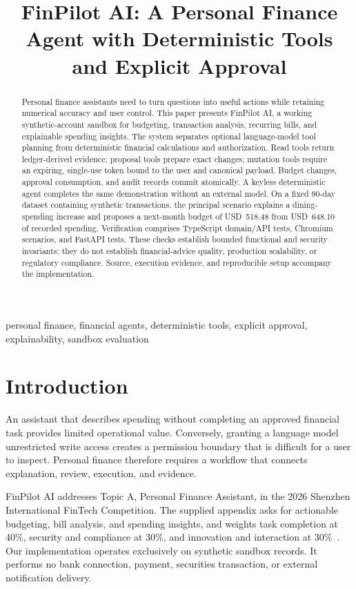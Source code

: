 \documentclass[conference,a4paper]{IEEEtran}
\title{FinPilot AI: A Personal Finance Agent with Deterministic Tools and Explicit Approval}
\begin{document}
\maketitle
\begin{abstract}
Personal finance assistants need to turn questions into useful actions while retaining numerical accuracy and user control. This paper presents FinPilot AI, a working synthetic-account sandbox for budgeting, transaction analysis, recurring bills, and explainable spending insights. The system separates optional language-model tool planning from deterministic financial calculations and authorization. Read tools return ledger-derived evidence; proposal tools prepare exact changes; mutation tools require an expiring, single-use token bound to the user and canonical payload. Budget changes, approval consumption, and audit records commit atomically. A keyless deterministic agent completes the same demonstration without an external model. On a fixed 90-day dataset containing \RecordedTransactions{} synthetic transactions, the principal scenario explains a dining-spending increase and proposes a next-month budget of USD~518.48 from USD~648.10 of recorded spending. Verification comprises \UnitTests{} TypeScript domain/API tests, \BrowserTests{} Chromium scenarios, and \PythonTests{} FastAPI tests. These checks establish bounded functional and security invariants; they do not establish financial-advice quality, production scalability, or regulatory compliance. Source, execution evidence, and reproducible setup accompany the implementation.
\end{abstract}
\begin{IEEEkeywords}
personal finance, financial agents, deterministic tools, explicit approval, explainability, sandbox evaluation
\end{IEEEkeywords}

\section{Introduction}
An assistant that describes spending without completing an approved financial task provides limited operational value. Conversely, granting a language model unrestricted write access creates a permission boundary that is difficult for a user to inspect. Personal finance therefore requires a workflow that connects explanation, review, execution, and evidence.

FinPilot AI addresses Topic A, Personal Finance Assistant, in the 2026 Shenzhen International FinTech Competition. The supplied appendix asks for actionable budgeting, bill analysis, and spending insights, and weights task completion at 40\%, security and compliance at 30\%, and innovation and interaction at 30\%~\cite{competition}. Our implementation operates exclusively on synthetic sandbox records. It performs no bank connection, payment, securities transaction, or external notification delivery.
\end{document}
